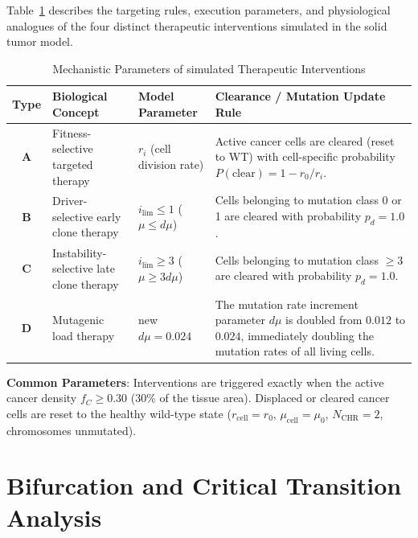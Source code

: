 \documentclass[11pt,a4paper]{article}
\begin{document}
Table~\ref{tab:interventions} describes the targeting rules, execution parameters, and physiological analogues of the four distinct therapeutic interventions simulated in the solid tumor model.

\begin{table}[htbp]
\centering
\begin{threeparttable}
\caption{Mechanistic Parameters of simulated Therapeutic Interventions}
\label{tab:interventions}
\begin{tabular}{cp{4.5cm}p{3cm}p{5.5cm}}
\toprule
\textbf{Type} & \textbf{Biological Concept} & \textbf{Model Parameter} & \textbf{Clearance / Mutation Update Rule} \\
\midrule
\textbf{A} & Fitness-selective targeted therapy & $r_i$ (cell division rate) & Active cancer cells are cleared (reset to WT) with cell-specific probability $P(\text{clear}) = 1 - r_0/r_i$. \\
\textbf{B} & Driver-selective early clone therapy & $i_{\lim} \le 1$ ($\mu \le d\mu$) & Cells belonging to mutation class 0 or 1 are cleared with probability $p_d = 1.0$. \\
\textbf{C} & Instability-selective late clone therapy & $i_{\lim} \ge 3$ ($\mu \ge 3 d\mu$) & Cells belonging to mutation class $\ge 3$ are cleared with probability $p_d = 1.0$. \\
\textbf{D} & Mutagenic load therapy & new $d\mu = 0.024$ & The mutation rate increment parameter $d\mu$ is doubled from $0.012$ to $0.024$, immediately doubling the mutation rates of all living cells. \\
\bottomrule
\end{tabular}
\begin{tablenotes}
\small
\item \textbf{Common Parameters}: Interventions are triggered exactly when the active cancer density $f_C \ge 0.30$ (30\% of the tissue area). Displaced or cleared cancer cells are reset to the healthy wild-type state ($r_{\text{cell}} = r_0$, $\mu_{\text{cell}} = \mu_0$, $N_{\text{CHR}} = 2$, chromosomes unmutated).
\end{tablenotes}
\end{threeparttable}
\end{table}

\section{Bifurcation and Critical Transition Analysis}
\label{sec:bifurcation}
\end{document}
